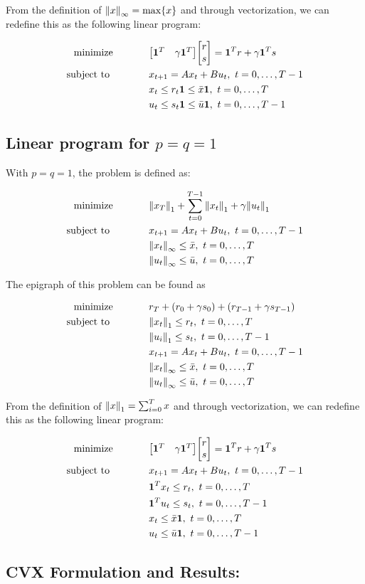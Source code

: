 \documentclass[letter]{article}
\newcommand{\optpblm}[3][eq:default]{
	\begin{equation}\label{#1}
		\begin{aligned}
			\text{minimize} \hspace{0.5in} &#2\vspace{5pt}\\
			\text{subject to \hspace{0.5in}} &#3
		\end{aligned}	
	\end{equation}
}
\begin{document}
From the definition of $\norm{x}_\infty = \max \{x\}$ and through vectorization, we can redefine this as the following linear program:
\optpblm{
	\mqty[\vb{1}^T & \gamma \vb{1}^T] \mqty[r\\s] 
	=\vb{1}^T r + \gamma \vb{1}^T s}{
	x_{t+1} = A x_t + B u_t, \ t = 0,\dots,T-1\\
	&x_t \leq r_t \vb{1} \leq \bar{x} \vb{1}, \ t = 0, \dots, T\\
	&u_t \leq s_t \vb{1} \leq \bar{u} \vb{1}, \ t = 0, \dots, T-1
	}

\subsection{Linear program for $p = q = 1$}
With $p = q = 1$, the problem is defined as:
\optpblm{\norm{x_T}_1 + \sum_{t = 0}^{T-1} \norm{x_t}_1 + \gamma\norm{u_t}_1}{
	x_{t+1} = A x_t + B u_t, \ t = 0,\dots,T-1\\
	& \norm{x_t}_\infty \leq \bar{x}, \ t = 0,\dots,T\\
	& \norm{u_t}_\infty \leq \bar{u}, \ t = 0,\dots,T}

The epigraph of this problem can be found as
\optpblm{r_T + (r_0 + \gamma s_0) + (r_{T-1} + \gamma s_{T-1})}{
	\norm{x_t}_1 \leq r_t, \ t = 0, \dots, T\\
	&\norm{u_i}_1 \leq s_t, \ t = 0, \dots, T-1\\
	&x_{t+1} = A x_t + B u_t, \ t = 0,\dots,T-1\\
	& \norm{x_t}_\infty \leq \bar{x}, \ t = 0,\dots,T\\
	& \norm{u_t}_\infty \leq \bar{u}, \ t = 0,\dots,T
}

From the definition of $\norm{x}_1 = \sum_{i=0}^T x$ and through vectorization, we can redefine this as the following linear program:
\optpblm{
	\mqty[\vb{1}^T & \gamma \vb{1}^T] \mqty[r\\s] 
	=\vb{1}^T r + \gamma \vb{1}^T s}{
	x_{t+1} = A x_t + B u_t, \ t = 0,\dots,T-1\\
	& \vb{1}^T x_t \leq r_t, \ t = 0,\dots,T\\
	& \vb{1}^T u_t \leq s_t, \ t = 0,\dots,T-1\\
	&x_t \leq \bar{x} \vb{1}, \ t = 0, \dots, T\\
	&u_t \leq \bar{u} \vb{1}, \ t = 0, \dots, T-1
}

\subsection{CVX Formulation and Results:}
\end{document}
